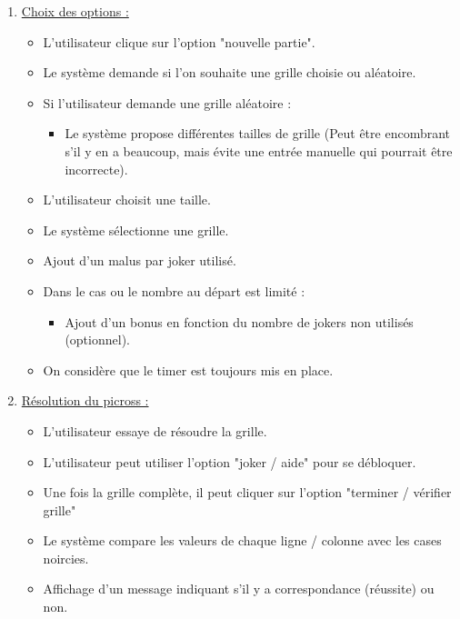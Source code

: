 \documentclass[a4paper, 12pt, twoside]{article}
\begin{document}
\begin{enumerate}
	\item{\ul{Choix des options :}}\newline
	\begin{itemize}\setlength{\itemsep}{5mm}
		\item L’utilisateur clique sur l'option "nouvelle partie".\newline
		\item Le système demande si l'on souhaite une grille choisie ou aléatoire.
		\item {Si l'utilisateur demande une grille al\'eatoire :}
		\begin{itemize}
			\item Le système propose différentes tailles de grille (Peut être encombrant s'il y en a beaucoup, mais évite une entrée manuelle qui pourrait être incorrecte).\newline
		\end{itemize}	

		\item L'utilisateur choisit une taille.
		\item Le système s\'electionne une grille.
		\item Ajout d'un malus par joker utilis\'e.
		\item {Dans le cas ou le nombre au départ est limit\'e :}
		\begin{itemize}\setlength{\itemsep}{3mm}
			\item Ajout d'un bonus en fonction du nombre de jokers non utilisés (optionnel).\newline
		\end{itemize}	
		\item On considère que le timer est toujours mis en place.
		\end{itemize}

	\item{\ul{R\'esolution du picross :}}\newline
	\begin{itemize}\setlength{\itemsep}{5mm}
		\item L'utilisateur essaye de résoudre la grille.
		\item L'utilisateur peut utiliser l'option "joker / aide" pour se débloquer.
		\item Une fois la grille complète, il peut cliquer sur l'option "terminer / vérifier grille"\newline

		\item Le système compare les valeurs de chaque ligne / colonne avec les cases noircies.
		\item Affichage d'un message indiquant s'il y a correspondance (réussite) ou non.\newline


\end{itemize}
\end{enumerate}
\end{document}
